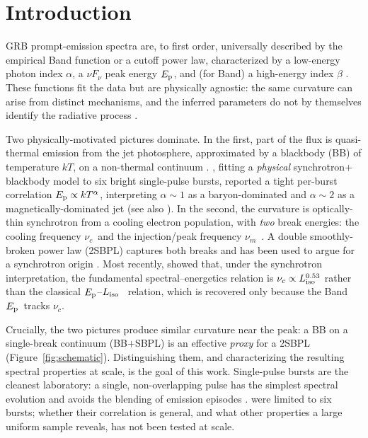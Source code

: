 \documentclass[twocolumn]{aastex631}
\newcommand{\nuc}{\ensuremath{\nu_c}}
\newcommand{\num}{\ensuremath{\nu_m}}
\newcommand{\Ep}{\ensuremath{E_{\rm p}}}
\newcommand{\kT}{\ensuremath{kT}}
\newcommand{\Liso}{\ensuremath{L_{\rm iso}}}
\begin{document}

\section{Introduction} \label{sec:intro}
GRB prompt-emission spectra are, to first order, universally described by the
empirical Band function \citep{Band1993} or a cutoff power law, characterized by
a low-energy photon index $\alpha$, a $\nu F_\nu$ peak energy \Ep, and (for Band)
a high-energy index $\beta$ \citep{Kaneko2006,Goldstein2012,Gruber2014,Yu2016}.
These functions fit the data but are physically agnostic: the same curvature can
arise from distinct mechanisms, and the inferred parameters do not by themselves
identify the radiative process \citep{KumarZhang2015}.

Two physically-motivated pictures dominate. In the first, part of the flux is
quasi-thermal emission from the jet photosphere, approximated by a blackbody (BB)
of temperature \kT, on a non-thermal continuum
\citep{MeszarosRees2000,Ryde2004,RydePeer2009,Peer2007,Guiriec2011}.
\citet{Burgess2014a}, fitting a \emph{physical} synchrotron$+$blackbody model to
six bright single-pulse bursts, reported a tight per-burst correlation
$\Ep\propto\kT^{\alpha}$, interpreting $\alpha\!\sim\!1$ as a baryon-dominated and
$\alpha\!\sim\!2$ as a magnetically-dominated jet (see also \citealt{Burgess2014b}).
In the second, the curvature is optically-thin synchrotron from a cooling
electron population, with \emph{two} break energies: the cooling frequency \nuc\
and the injection/peak frequency \num\ \citep{Sari1998}. A double smoothly-broken
power law (2SBPL) captures both breaks and has been used to argue for a
synchrotron origin \citep{Oganesyan2017,Oganesyan2018,Oganesyan2019,Ravasio2018,Ravasio2019}.
Most recently, \citet{Mei2024} showed that, under the synchrotron interpretation,
the fundamental spectral--energetics relation is $\nuc\propto\Liso^{0.53}$ rather
than the classical $\Ep$--\Liso\ \citep[Yonetoku;][]{Yonetoku2004} relation, which
is recovered only because the Band \Ep\ tracks \nuc.

Crucially, the two pictures produce similar curvature near the peak: a BB on a
single-break continuum (BB$+$SBPL) is an effective \emph{proxy} for a 2SBPL
(Figure~\ref{fig:schematic}). Distinguishing them, and characterizing the
resulting spectral properties at scale, is the goal of this work. Single-pulse
bursts are the cleanest laboratory: a single, non-overlapping pulse has the
simplest spectral evolution and avoids the blending of emission episodes
\citep{Burgess2014b,RydePeer2009,Busby2024}. \citet{Burgess2014a} were limited to
six bursts; whether their correlation is general, and what other properties a
large uniform sample reveals, has not been tested at scale.
\end{document}
